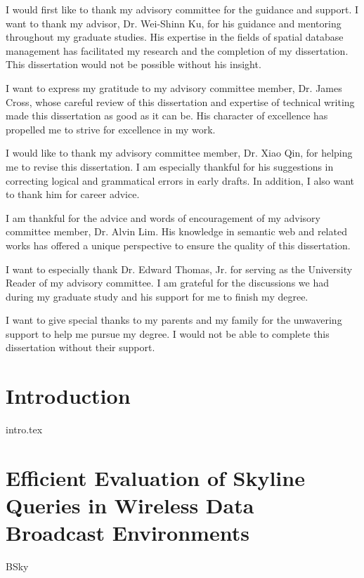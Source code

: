 \documentclass[12pt]{report}
\begin{document}
\begin{romanpages}
\begin{acknowledgments}

I would first like to thank my advisory committee for the guidance and support.
I want to thank my advisor, Dr. Wei-Shinn Ku, for his guidance and mentoring throughout my graduate studies. His expertise in the fields of spatial database management has facilitated my research and the completion of my dissertation. This dissertation would not be possible without his insight.

I want to express my gratitude to my advisory committee member, Dr. James Cross, whose careful review of this dissertation and expertise of technical writing made this dissertation as good as it can be. His character of excellence has propelled me to strive for excellence in my work.

I would like to thank my advisory committee member, Dr. Xiao Qin, for helping me to revise this dissertation. I am especially thankful for his suggestions in correcting logical and grammatical errors in early drafts. In addition, I also want to thank him for career advice.

I am thankful for the advice and words of encouragement of my advisory committee member, Dr. Alvin Lim. His knowledge in semantic web and related works has offered a unique perspective to ensure the quality of this dissertation.

I want to especially thank Dr. Edward Thomas, Jr. for serving as the University Reader of my advisory committee. I am grateful for the discussions we had during my graduate study and his support for me to finish my degree.

I want to give special thanks to my parents and my family for the unwavering support to help me pursue my degree. I would not be able to complete this dissertation without their support.
\end{acknowledgments}

\tableofcontents
\listoffigures
\listoftables
\end{romanpages}        %



\chapter{Introduction}
{intro.tex}

\chapter{Efficient Evaluation of Skyline Queries in Wireless Data Broadcast Environments}
{BSky}
\end{document}
